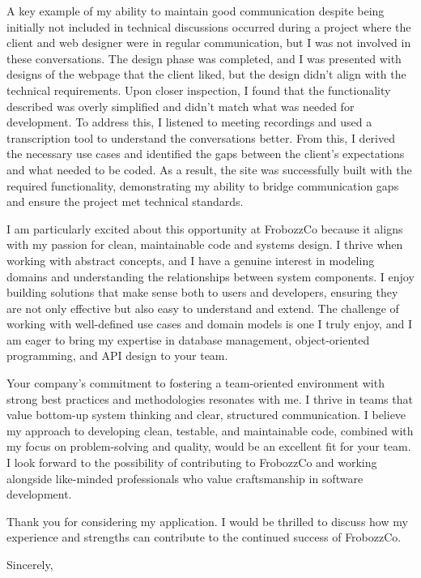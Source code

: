 \documentclass[10pt]{letter}
\begin{document}
\begin{letter}{}
    A key example of my ability to maintain good communication despite being initially not included in technical discussions occurred during a project where the client and web designer were in regular communication, but I was not involved in these conversations. The design phase was completed, and I was presented with designs of the webpage that the client liked, but the design didn’t align with the technical requirements. Upon closer inspection, I found that the functionality described was overly simplified and didn't match what was needed for development. To address this, I listened to meeting recordings and used a transcription tool to understand the conversations better. From this, I derived the necessary use cases and identified the gaps between the client’s expectations and what needed to be coded. As a result, the site was successfully built with the required functionality, demonstrating my ability to bridge communication gaps and ensure the project met technical standards.
    
    I am particularly excited about this opportunity at FrobozzCo because it aligns with my passion for clean, maintainable code and systems design. I thrive when working with abstract concepts, and I have a genuine interest in modeling domains and understanding the relationships between system components. I enjoy building solutions that make sense both to users and developers, ensuring they are not only effective but also easy to understand and extend. The challenge of working with well-defined use cases and domain models is one I truly enjoy, and I am eager to bring my expertise in database management, object-oriented programming, and API design to your team.
    
    Your company’s commitment to fostering a team-oriented environment with strong best practices and methodologies resonates with me. I thrive in teams that value bottom-up system thinking and clear, structured communication. I believe my approach to developing clean, testable, and maintainable code, combined with my focus on problem-solving and quality, would be an excellent fit for your team. I look forward to the possibility of contributing to FrobozzCo and working alongside like-minded professionals who value craftsmanship in software development.
    
    Thank you for considering my application. I would be thrilled to discuss how my experience and strengths can contribute to the continued success of FrobozzCo.
    
\closing{Sincerely,}

\end{letter}
\end{document}

